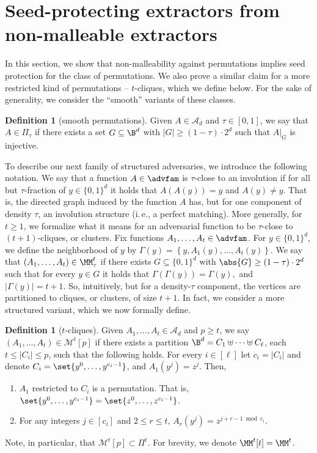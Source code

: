 \documentclass[11pt]{article}
\numberwithin{equation}{section}
\theoremstyle{definition}
\newtheorem{definition}[theorem]{Definition}
\theoremstyle{plain}
\newcommand{\ie}{i.\,e.}
\begin{document}
%
\section{Seed-protecting   %
extractors from non-malleable extractors}

In this section, we show that non-malleability against permutations
implies seed protection for the class of permutations. We also prove a similar claim for a more
restricted kind of permutations -- $t$-cliques, which we define below. For the sake of generality, we consider the ``smooth'' variants of these classes.

\begin{definition}[smooth permutations]\label{def:smooth2}
Given $A \in \mathcal{A}_d$ and $\tau \in [0,1]$, we say that $A \in \Pi_\tau$ if there exists a set $G \subseteq \B^d$ 
with $|G| \ge (1-\tau) \cdot 2^d$ such that $A|_G$ is injective.
\end{definition}

To describe our next family of structured adversaries, we introduce the following notation. We say that a function $A \in \advfam$ is $\tau$-close to an involution if for all but $\tau$-fraction of $y \in \{0,1\}^d$ it holds that $A(A(y)) = y$ and $A(y) \neq y$. That is, the directed graph induced by the function $A$ has, but for one component of density $\tau$, an involution structure (\ie, a perfect matching). More generally, for $t \ge 1$, we formalize what it means for an adversarial function to be $\tau$-close to  $(t+1)$-cliques, or clusters. Fix functions $A_1,\ldots,A_t \in \advfam$. For $y\in \{0,1\}^d$, we define the neighborhood of $y$ by
	$
	\Gamma(y) = \left\{y,A_1(y),\ldots, A_t(y)\right\}.
	$	
	We say that $(A_1,\ldots,A_t) \in \MM_\tau^t$ if there exists $G \subseteq \{0,1\}^d$ with $\abs{G} \geq (1-\tau)\cdot2^d$ such that for every $y \in G$ it holds that
	$
	\Gamma(\Gamma(y)) = \Gamma(y),
	$
	and $|\Gamma(y)| = t+1$. So, intuitively, but for a density-$\tau$ component, the vertices are partitioned to cliques, or clusters, of size $t+1$. In fact, we consider a more structured variant, which we now formally define.


\begin{definition}[$t$-cliques]\label{def:cliques}
Given $A_1,\ldots,A_t \in \mathcal{A}_d$ and $p \ge t$, we say
$\left(A_1,\ldots,A_t \right) \in \mathcal{M}^{t}[p]$ if there exists a
partition $\B^d = C_1 \uplus \cdots \uplus C_\ell$, each $t \le |C_i| \le p$, such that
the following holds. For every $i \in [\ell]$ let $c_i = |C_i|$ and denote $C_i = \set{y^{0},\ldots,y^{c_i-1}}$, and $A_{1}\left(y^{j}\right) = z^{j}$. Then,
\begin{enumerate}
    \item $A_1$ restricted to $C_i$ is a permutation. That is, $\set{y^{0},\ldots,y^{c_i-1}} = \set{z^{0},\ldots,z^{c_i-1}}$. 
    \item For any integers $j \in [c_i]$ and $2 \le r \le t$, $A_{r}\left( y^j \right) = z^{j+ r-1 \bmod c_i}$.
\end{enumerate}
Note, in particular, that $\mathcal{M}^t[p] \subset \Pi^t$. For brevity, we denote $\MM^t[t] = \MM^t$.
\end{definition}
\end{document}
